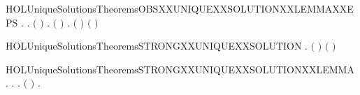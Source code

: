\begin{SaveVerbatim}{HOLUniqueSolutionsTheoremsOBSXXUNIQUEXXSOLUTIONXXLEMMAXXEPS}
\HOLTokenTurnstile{} \HOLSymConst{\HOLTokenForall{}}.
         \HOLSymConst{\HOLTokenConj{}}   \HOLSymConst{\HOLTokenImp{}}
       \HOLSymConst{\HOLTokenForall{}} .
            \ensuremath{(} \ensuremath{)}  \HOLSymConst{\HOLTokenImp{}}
           \HOLSymConst{\HOLTokenExists{}}.   \HOLSymConst{\HOLTokenConj{}}   \HOLSymConst{\HOLTokenConj{}} \ensuremath{(} \HOLSymConst{\ensuremath{=}}  \ensuremath{)} \HOLSymConst{\HOLTokenConj{}} \HOLSymConst{\HOLTokenForall{}}.  \ensuremath{(} \ensuremath{)} \ensuremath{(} \ensuremath{)}
\end{SaveVerbatim}
\newcommand{\HOLUniqueSolutionsTheoremsOBSXXUNIQUEXXSOLUTIONXXLEMMAXXEPS}{\UseVerbatim{HOLUniqueSolutionsTheoremsOBSXXUNIQUEXXSOLUTIONXXLEMMAXXEPS}}
\begin{SaveVerbatim}{HOLUniqueSolutionsTheoremsSTRONGXXUNIQUEXXSOLUTION}
\HOLTokenTurnstile{} \HOLSymConst{\HOLTokenForall{}}  .
         \HOLSymConst{\HOLTokenConj{}}   \ensuremath{(} \ensuremath{)} \HOLSymConst{\HOLTokenConj{}}   \ensuremath{(} \ensuremath{)} \HOLSymConst{\HOLTokenImp{}}
         
\end{SaveVerbatim}
\newcommand{\HOLUniqueSolutionsTheoremsSTRONGXXUNIQUEXXSOLUTION}{\UseVerbatim{HOLUniqueSolutionsTheoremsSTRONGXXUNIQUEXXSOLUTION}}
\begin{SaveVerbatim}{HOLUniqueSolutionsTheoremsSTRONGXXUNIQUEXXSOLUTIONXXLEMMA}
\HOLTokenTurnstile{} \HOLSymConst{\HOLTokenForall{}}.
         \HOLSymConst{\HOLTokenImp{}}
       \HOLSymConst{\HOLTokenForall{}}  .
             \HOLTokenTransBegin{}\HOLTokenTransEnd {} \HOLSymConst{\HOLTokenImp{}}
           \HOLSymConst{\HOLTokenExists{}}.   \HOLSymConst{\HOLTokenConj{}} \ensuremath{(} \HOLSymConst{\ensuremath{=}}  \ensuremath{)} \HOLSymConst{\HOLTokenConj{}} \HOLSymConst{\HOLTokenForall{}}.   \HOLTokenTransBegin{}\HOLTokenTransEnd {} 
\end{SaveVerbatim}
